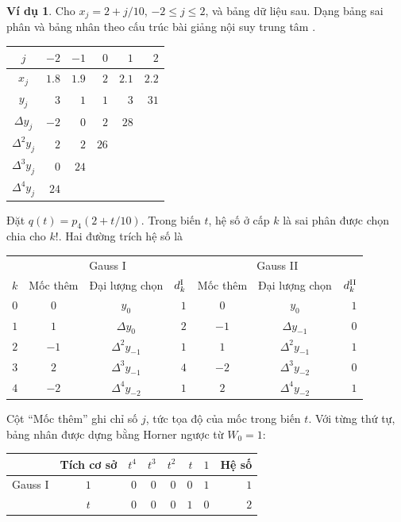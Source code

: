 \documentclass[12pt,a4paper,oneside]{book}
\numberwithin{algorithm}{chapter}
\theoremstyle{definition}
\newtheorem{vidu}{Ví dụ}[chapter]
\begin{document}
\begin{vidu}\label{vidu:central-five-table}
Cho $x_j=2+j/10$, $-2\leq j\leq2$, và bảng dữ liệu sau. Dạng bảng sai phân và bảng nhân theo cấu trúc bài giảng nội suy trung tâm \cite{central-slides}.
\begin{center}
\begin{tabular}{c|rrrrr}\toprule
$j$&$-2$&$-1$&$0$&$1$&$2$\\\midrule
$x_j$&$1.8$&$1.9$&$2$&$2.1$&$2.2$\\
$y_j$&$3$&$1$&$1$&$3$&$31$\\
$\Delta y_j$&$-2$&$0$&$2$&$28$&\\
$\Delta^2y_j$&$2$&$2$&$26$&&\\
$\Delta^3y_j$&$0$&$24$&&&\\
$\Delta^4y_j$&$24$&&&&\\\bottomrule
\end{tabular}
\end{center}
Đặt $q(t)=p_4(2+t/10)$. Trong biến $t$, hệ số ở cấp $k$ là sai phân được chọn chia cho $k!$. Hai đường trích hệ số là
\begin{center}
\small\setlength{\tabcolsep}{5pt}
\begin{tabular}{c|c|c|r|c|c|r}\toprule
&\multicolumn{3}{c|}{Gauss I}&\multicolumn{3}{c}{Gauss II}\\
$k$&Mốc thêm&Đại lượng chọn&$d_k^{\rm I}$&Mốc thêm&Đại lượng chọn&$d_k^{\rm II}$\\\midrule
$0$&$0$&$y_0$&$1$&$0$&$y_0$&$1$\\
$1$&$1$&$\Delta y_0$&$2$&$-1$&$\Delta y_{-1}$&$0$\\
$2$&$-1$&$\Delta^2y_{-1}$&$1$&$1$&$\Delta^2y_{-1}$&$1$\\
$3$&$2$&$\Delta^3y_{-1}$&$4$&$-2$&$\Delta^3y_{-2}$&$0$\\
$4$&$-2$&$\Delta^4y_{-2}$&$1$&$2$&$\Delta^4y_{-2}$&$1$\\\bottomrule
\end{tabular}
\end{center}
Cột ``Mốc thêm'' ghi chỉ số $j$, tức tọa độ của mốc trong biến $t$. Với từng thứ tự, bảng nhân được dựng bằng Horner ngược từ $W_0=1$:
\begin{center}
\small\setlength{\tabcolsep}{6pt}
\begin{tabular}{c|c|rrrrr|r}\toprule
&Tích cơ sở&$t^4$&$t^3$&$t^2$&$t$&$1$&Hệ số\\\midrule
Gauss I&$1$&$0$&$0$&$0$&$0$&$1$&$1$\\
&$t$&$0$&$0$&$0$&$1$&$0$&$2$\\

\end{tabular}
\end{center}
\end{vidu}
\end{document}
